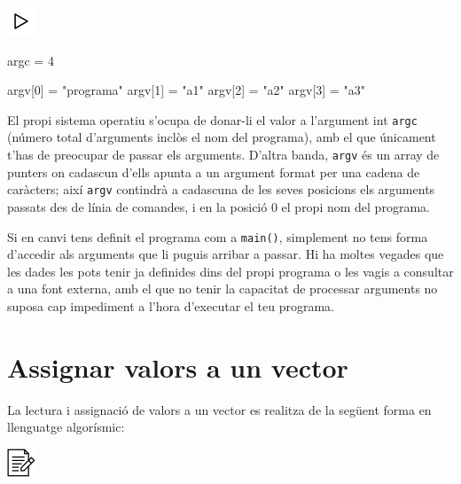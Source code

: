 \documentclass[
]{book}
\newenvironment{Shaded}{\begin{snugshade}}{\end{snugshade}}
\newcommand{\DecValTok}[1]{\textcolor[rgb]{0.00,0.00,0.81}{#1}}
\newcommand{\NormalTok}[1]{#1}
\newcommand{\StringTok}[1]{\textcolor[rgb]{0.31,0.60,0.02}{#1}}
\begin{document}
\includegraphics{./img/play.png}

\begin{Shaded}
\begin{Highlighting}[]
\NormalTok{argc = }\DecValTok{4}

\NormalTok{argv[}\DecValTok{0}\NormalTok{] = }\StringTok{"programa"}
\NormalTok{argv[}\DecValTok{1}\NormalTok{] = }\StringTok{"a1"}
\NormalTok{argv[}\DecValTok{2}\NormalTok{] = }\StringTok{"a2"}
\NormalTok{argv[}\DecValTok{3}\NormalTok{] = }\StringTok{"a3"}
\end{Highlighting}
\end{Shaded}

El propi sistema operatiu s'ocupa de donar-li el valor a l'argument int \texttt{argc} (número total d'arguments inclòs el nom del programa), amb el que únicament t'has de preocupar de passar els arguments. D'altra banda, \texttt{argv} és un array de punters on cadascun d'ells apunta a un argument format per una cadena de caràcters; així \texttt{argv} contindrà a cadascuna de les seves posicions els arguments passats des de línia de comandes, i en la posició 0 el propi nom del programa.

Si en canvi tens definit el programa com a \texttt{main()}, simplement no tens forma d'accedir als arguments que li puguis arribar a passar. Hi ha moltes vegades que les dades les pots tenir ja definides dins del propi programa o les vagis a consultar a una font externa, amb el que no tenir la capacitat de processar arguments no suposa cap impediment a l'hora d'executar el teu programa.

\hypertarget{assignar-valors-a-un-vector}{%
\section{Assignar valors a un vector}\label{assignar-valors-a-un-vector}}

La lectura i assignació de valors a un vector es realitza de la següent forma en llenguatge algorísmic:

\includegraphics{./img/alg.png}
\end{document}
